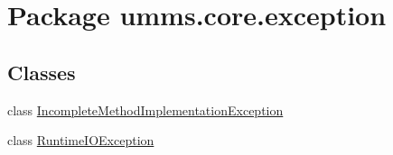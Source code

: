 \hypertarget{namespaceumms_1_1core_1_1exception}{\section{Package umms.\+core.\+exception}
\label{namespaceumms_1_1core_1_1exception}
}
\subsection*{Classes}
\begin{DoxyCompactItemize}
\item 
class \hyperlink{classumms_1_1core_1_1exception_1_1_incomplete_method_implementation_exception}{Incomplete\+Method\+Implementation\+Exception}
\item 
class \hyperlink{classumms_1_1core_1_1exception_1_1_runtime_i_o_exception}{Runtime\+I\+O\+Exception}
\end{DoxyCompactItemize}
